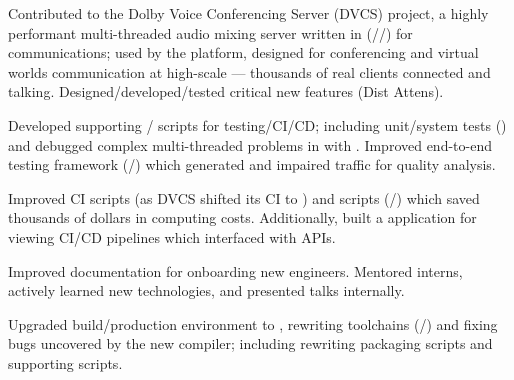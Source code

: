 \documentclass[a4paper]{resume}
\begin{document}
\begin{minipage}[t]{0.66\textwidth}
	\begin{tightitemize}
		\item {
		            Contributed to the Dolby Voice Conferencing Server (DVCS) project, a highly performant multi-threaded
		            audio mixing server written in \cpp{} (\cppstd{}/\conan{}/\cmake{}) for \voip{} communications; used by
		            the \dolbyio{} platform, designed for conferencing and virtual worlds communication at high-scale ---
		            thousands of real clients connected and talking. Designed/developed/tested critical new features (Dist
		            Attens).
		      }
		\item {
		            Developed supporting \python{}/\bash{} scripts for testing/CI/CD; including unit/system tests
		            (\googletest{}) and debugged complex multi-threaded problems in \cpp{} with \gdb{}. Improved \oats{}
		            end-to-end testing framework (\python{}/\asyncio{}) which generated \rtp{} and impaired traffic for
		            quality analysis.
		      }
		\item {
		            Improved CI scripts (as DVCS shifted its CI to \gitlab) and \aws{} scripts (\python/\boto) which saved
		            thousands of dollars in \ectwo{} computing costs. Additionally, built a \nodejs{} \typescript{}
		            application for viewing CI/CD pipelines which interfaced with \gitlab{} \rest{} APIs.
		      }
		\item {
		            Improved documentation for onboarding new engineers. Mentored interns, actively learned new technologies,
		            and presented talks internally.
		      }
		\item {
		            Upgraded build/production environment to \debian{}, rewriting toolchains (\conan{}/\cmake{}) and fixing
		            bugs uncovered by the new compiler; including rewriting packaging scripts and supporting \python scripts.
		      }
	\end{tightitemize}
	\smallsectionspace{}


\end{minipage}
\end{document}

